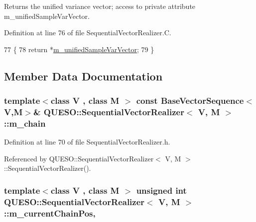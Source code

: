 Returns the unified variance vector; access to private attribute m\-\_\-unified\-Sample\-Var\-Vector. 



Definition at line 76 of file Sequential\-Vector\-Realizer.\-C.


\begin{DoxyCode}
77 \{
78   \textcolor{keywordflow}{return} *\hyperlink{class_q_u_e_s_o_1_1_sequential_vector_realizer_a8c4b1311f473131c0ab55f02096b252b}{m\_unifiedSampleVarVector};
79 \}
\end{DoxyCode}


\subsection{Member Data Documentation}
\hypertarget{class_q_u_e_s_o_1_1_sequential_vector_realizer_a4072619c7ef9d9f196bb0d70ec9e8479}{
\subsubsection[{m\-\_\-chain}]{\setlength{\rightskip}{0pt plus 5cm}template$<$class V , class M $>$ const {\bf Base\-Vector\-Sequence}$<$V,M$>$\& {\bf Q\-U\-E\-S\-O\-::\-Sequential\-Vector\-Realizer}$<$ V, M $>$\-::m\-\_\-chain\hspace{0.3cm}{\ttfamily [private]}}}\label{class_q_u_e_s_o_1_1_sequential_vector_realizer_a4072619c7ef9d9f196bb0d70ec9e8479}


Definition at line 70 of file Sequential\-Vector\-Realizer.\-h.



Referenced by Q\-U\-E\-S\-O\-::\-Sequential\-Vector\-Realizer$<$ V, M $>$\-::\-Sequential\-Vector\-Realizer().

\hypertarget{class_q_u_e_s_o_1_1_sequential_vector_realizer_aee9ff35b276862ab8aefd7f2dbe6d232}{
\subsubsection[{m\-\_\-current\-Chain\-Pos}]{\setlength{\rightskip}{0pt plus 5cm}template$<$class V , class M $>$ unsigned int {\bf Q\-U\-E\-S\-O\-::\-Sequential\-Vector\-Realizer}$<$ V, M $>$\-::m\-\_\-current\-Chain\-Pos\hspace{0.3cm}{\ttfamily [mutable]}, {\ttfamily [private]}}}\label{class_q_u_e_s_o_1_1_sequential_vector_realizer_aee9ff35b276862ab8aefd7f2dbe6d232}


